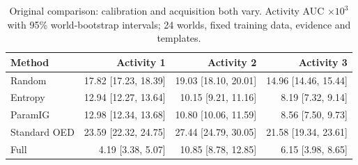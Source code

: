 \begin{table}[tbp]
\centering
\caption{Original comparison: calibration and acquisition both vary. Activity AUC $\times10^3$ with 95\% world-bootstrap intervals; 24 worlds, fixed training data, evidence and templates.}
\label{tab:acquisition_original}
\scriptsize
\setlength{\tabcolsep}{3pt}
\begin{tabular}{lrrr}
\toprule
Method & Activity 1 & Activity 2 & Activity 3 \\
\midrule
Random & 17.82 [17.23, 18.39] & 19.03 [18.10, 20.01] & 14.96 [14.46, 15.44] \\
Entropy & 12.94 [12.27, 13.64] & 10.15 [9.21, 11.16] & 8.19 [7.32, 9.14] \\
ParamIG & 12.98 [12.34, 13.68] & 10.80 [10.06, 11.59] & 8.56 [7.50, 9.73] \\
Standard OED & 23.59 [22.32, 24.75] & 27.44 [24.79, 30.05] & 21.58 [19.34, 23.61] \\
Full & 4.19 [3.38, 5.07] & 10.85 [8.78, 12.85] & 6.15 [3.98, 8.65] \\
\bottomrule
\end{tabular}
\end{table}

